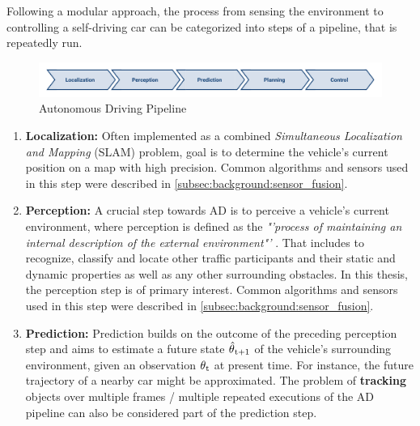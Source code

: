 Following a modular approach, the process from sensing the environment to controlling a self-driving car can be categorized into steps of a pipeline, that is repeatedly run. 

\begin{figure}[H]
	\centering
	\includegraphics[width=\textwidth]{98_images/ad_pipeline}
	\caption{Autonomous Driving Pipeline}
	\label{fig:autonomous_driving_pipeline}
\end{figure}

\begin{enumerate}
	\item \textbf{Localization:} Often implemented as a combined \textit{Simultaneous Localization and Mapping} (SLAM) problem, goal is to determine the vehicle's current position on a map with high precision. Common algorithms and sensors used in this step were described in \cref{subsec:background:sensor_fusion}.
	\item \textbf{Perception:} A crucial step towards AD is to perceive a vehicle's current environment, where perception is defined as the \textit{"'process of maintaining an internal description of the external environment"'} \cite{Crowley1993}. That includes to recognize, classify and locate other traffic participants and their static and dynamic properties as well as any other surrounding obstacles. In this thesis, the perception step is of primary interest. Common algorithms and sensors used in this step were described in \cref{subsec:background:sensor_fusion}.
	\item \textbf{Prediction:} Prediction builds on the outcome of the preceding perception step and aims to estimate a future state $\hat{\theta}\textsubscript{t+1}$ of the vehicle's surrounding environment, given an observation $\theta\textsubscript{t}$ at present time. For instance, the future trajectory of a nearby car might be approximated. The problem of \textbf{tracking} objects over multiple frames / multiple repeated executions of the AD pipeline can also be considered part of the prediction step. 

\end{enumerate}
